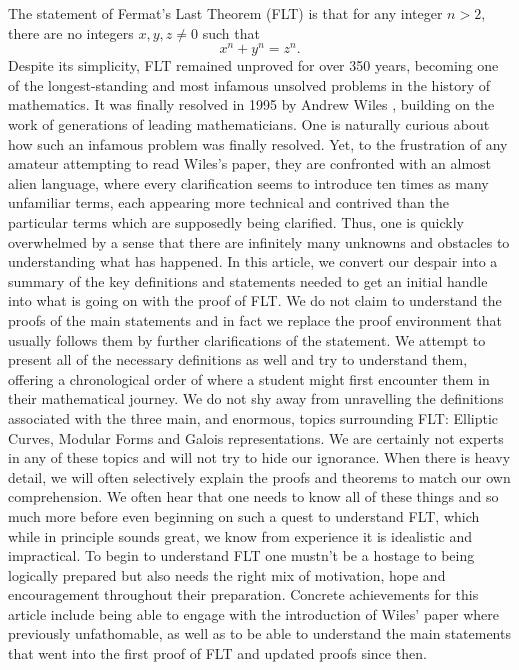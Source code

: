 \documentclass{article}
\theoremstyle{definition}
\theoremstyle{definition}
\theoremstyle{definition}
\begin{document}
The statement of Fermat's Last Theorem (FLT) is that for any integer $n>2$, there are no integers $x,y,z\neq0$ such that
$$x^n+y^n=z^n.$$
Despite its simplicity, FLT remained unproved for over 350 years, becoming one of the longest-standing and most infamous unsolved problems in the history of mathematics. It was finally resolved in 1995 by Andrew Wiles \cite{Wiles}, building on the work of generations of leading mathematicians.
\newline\newline
One is naturally curious about how such an infamous problem was finally resolved. Yet, to the frustration of any amateur attempting to read Wiles’s paper, they are confronted with an almost alien language, where every clarification seems to introduce ten times as many unfamiliar terms, each appearing more technical and contrived than the particular terms which are supposedly being clarified. Thus, one is quickly overwhelmed by a sense that there are infinitely many unknowns and obstacles to understanding what has happened. 
\newline\newline
In this article, we convert our despair into a summary of the key definitions and statements needed to get an initial handle into what is going on with the proof of FLT. We do not claim to understand the proofs of the main statements and in fact we replace the proof environment that usually follows them by further clarifications of the statement. We attempt to present all of the necessary definitions as well and try to understand them, offering a chronological order of where a student might first encounter them in their mathematical journey.
\newline\newline
We do not shy away from unravelling the definitions associated with the three main, and enormous, topics surrounding FLT: Elliptic Curves, Modular Forms and Galois representations. We are certainly not experts in any of these topics and will not try to hide our ignorance. When there is heavy detail, we will often selectively explain the proofs and theorems to match our own comprehension.
\newline\newline
We often hear that one needs to know all of these things and so much more before even beginning on such a quest to understand FLT, which while in principle sounds great, we know from experience it is idealistic and impractical. To begin to understand FLT one mustn't be a hostage to being logically prepared but also needs the right mix of motivation, hope and encouragement throughout their preparation.
\newline\newline
Concrete achievements for this article include being able to engage with the introduction of Wiles' paper where previously unfathomable, as well as to be able to understand the main statements that went into the first proof of FLT and updated proofs since then.
\end{document}
